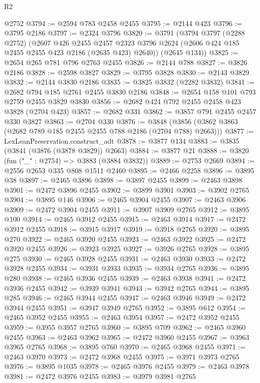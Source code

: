 \begin{lexlean}{R2}
\begin{coremodule}
    @2752
@3794 := @2594 @783 @2458 @2455
@3795 := @2144 @423
@3796 := @3795 @2186
@3797 := @2324 @3796
@3820 := @3791
    (@3794
      @3797
      (@2288 @2752)
      (@2607
        @426
        @2455
        @2457
        @2323
        @3796
        @2624
        (@2606 @424 @185 @2455 @2455 @423 @2186 (@2635 @423) @2640))
      (@2645 @134))
@3825 := @2654 @265 @781 @796 @2763 @2455
@3826 := @2144 @788
@3827 := @3826 @2186
@3828 := @2598 @3827
@3829 := @3795 @3828
@3830 := @2143 @3829
@3832 := @2144 @3830 @2186
@3835 := @3825 @3832 (@2282 @3832)
@3841 := @2682 @794 @185 @2761 @2455 @3830 @2186
@3848 := @2654 @158 @101 @793 @2759 @2455 @3829 @3830
@3856 := @2682 @424 @792 @2455 @2458 @423 @3828 (@2704 @423)
@3857 := @2682 @331
@3862 := @3857 @791 @2455 @2457 @330 @3827
@3863 := @2704 @330
@3876 := @3848 (@3856 (@3862 @3863 (@2682 @789 @185 @2455 @2455 @788 @2186 (@2704 @788) @2663)))
@3877 := LexLeanPreservation.construct_adt
@3878 := @3877 @134
@3883 := @3835 (@3841 (@3876 (@3878 @3829)) @2663)
@3884 := @3877 @21
@3888 := @3820 (fun ("_" : @2754) => @3883 (@3884 @3832))
@3889 := @2753 @2669
@3894 := @2556 @2653 @335 @808 @1511 @2460
@3895 := @2466 @2258
@3896 := @3895 @38
@3897 := @2465 @3896
@3898 := @3897 @2455
@3899 := @2463 @3898
@3901 := @2472 @3896 @2455
@3902 := @3899 @3901
@3903 := @3902 @2765
@3904 := @3895 @146
@3906 := @2465 @3904 @2455
@3907 := @2463 @3906
@3909 := @2472 @3904 @2455
@3911 := @3907 @3909 @2765
@3912 := @3895 @100
@3914 := @2465 @3912 @2455
@3915 := @2463 @3914
@3917 := @2472 @3912 @2455
@3918 := @3915 @3917
@3919 := @3918 @2765
@3920 := @3895 @270
@3922 := @2465 @3920 @2455
@3923 := @2463 @3922
@3925 := @2472 @3920 @2455
@3926 := @3923 @3925
@3927 := @3926 @2765
@3928 := @3895 @275
@3930 := @2465 @3928 @2455
@3931 := @2463 @3930
@3933 := @2472 @3928 @2455
@3934 := @3931 @3933
@3935 := @3934 @2765
@3936 := @3895 @280
@3938 := @2465 @3936 @2455
@3939 := @2463 @3938
@3941 := @2472 @3936 @2455
@3942 := @3939 @3941
@3943 := @3942 @2765
@3944 := @3895 @285
@3946 := @2465 @3944 @2455
@3947 := @2463 @3946
@3949 := @2472 @3944 @2455
@3951 := @3947 @3949 @2765
@3952 := @3895 @612
@3954 := @2465 @3952 @2455
@3955 := @2463 @3954
@3957 := @2472 @3952 @2455
@3959 := @3955 @3957 @2765
@3960 := @3895 @709
@3962 := @2465 @3960 @2455
@3963 := @2463 @3962
@3965 := @2472 @3960 @2455
@3967 := @3963 @3965 @2765
@3968 := @3895 @760
@3970 := @2465 @3968 @2455
@3971 := @2463 @3970
@3973 := @2472 @3968 @2455
@3975 := @3971 @3973 @2765
@3976 := @3895 @1035
@3978 := @2465 @3976 @2455
@3979 := @2463 @3978
@3981 := @2472 @3976 @2455
@3983 := @3979 @3981 @2765

\end{coremodule}
\end{lexlean}
